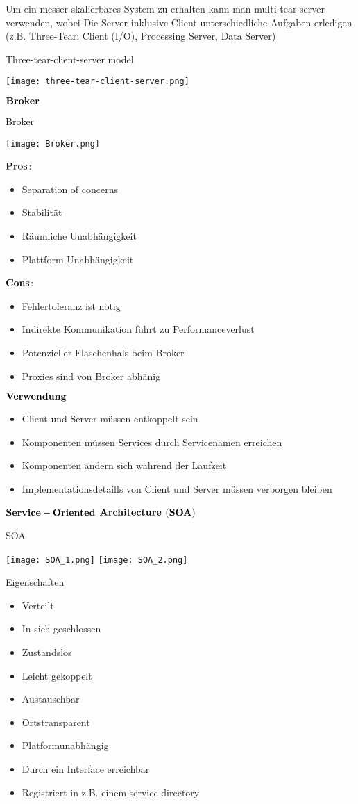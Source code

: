 Um ein messer skalierbares System zu erhalten kann man multi-tear-server verwenden, wobei Die Server inklusive Client unterschiedliche Aufgaben erledigen (z.B. Three-Tear: Client (I/O), Processing Server, Data Server) 
\begin{table}[H]
\caption{Three-tear-client-server model}
\texttt{[image: three-tear-client-server.png]}	
\end{table}

$\bold{Broker}$
\begin{table}[H]
\caption{Broker}
\texttt{[image: Broker.png]}	
\end{table}
\begin{multicols}{2}
$\bold{Pros}$:
\begin{itemize}
	\item Separation of concerns
	\item Stabilität
	\item Räumliche Unabhängigkeit 
	\item Plattform-Unabhängigkeit
\end{itemize}
\columnbreak
$\bold{Cons}$:
\begin{itemize}
	\item Fehlertoleranz ist nötig
	\item Indirekte Kommunikation führt zu Performanceverlust
	\item Potenzieller Flaschenhals beim Broker
	\item Proxies sind von Broker abhänig
\end{itemize}
\end{multicols}
$\bold{Verwendung}$
\begin{itemize}
	\item Client und Server müssen entkoppelt sein
	\item Komponenten müssen Services durch Servicenamen erreichen
	\item Komponenten ändern sich während der Laufzeit
	\item Implementationsdetaills von Client und Server müssen verborgen bleiben
\end{itemize}
$\bold{Service-Oriented}$ $\bold{Architecture}$ $\bold{(SOA)}$
\begin{table}[H]
\caption{SOA}
\texttt{[image: SOA\_1.png]}
\texttt{[image: SOA\_2.png]}	
\end{table}
Eigenschaften
\begin{itemize}
	\item Verteilt
	\item In sich geschlossen
	\item Zustandslos
	\item Leicht gekoppelt
	\item Austauschbar
	\item Ortstransparent
	\item Platformunabhängig
	\item Durch ein Interface erreichbar
	\item Registriert in z.B. einem service directory 
\end{itemize}
